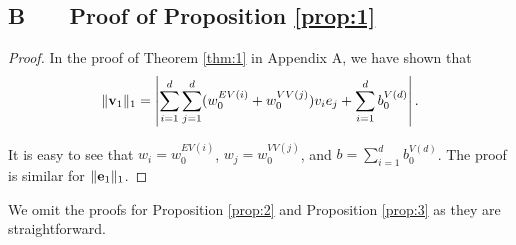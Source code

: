 \documentclass[sigconf]{acmart}
\begin{document}
	
	\subsection*{B \ \ \ Proof of Proposition \ref{prop:1}}
	
	\begin{proof}
		In the proof of Theorem \ref{thm:1} in Appendix A, we have shown that
		\begin{equation*}
			\|{\bf v}_1\|_1 = \left| \sum_{i=1}^d \sum_{j=1}^d (w_0^{EV(i)} + w_0^{VV(j)}) v_i e_j + \sum_{i=1}^d b_0^{V(d)} \right|.
		\end{equation*}
		
		It is easy to see that $w_i = w_0^{EV(i)}$, $w_j = w_0^{VV(j)}$, and $b = \sum_{i=1}^d b_0^{V(d)}$.
		The proof is similar for $\|{\bf e}_1\|_1$.
	\end{proof}
	
	\vspace{1em}
	
	We omit the proofs for Proposition \ref{prop:2} and Proposition \ref{prop:3} as they are straightforward.
	
	
	

 
\end{document}
